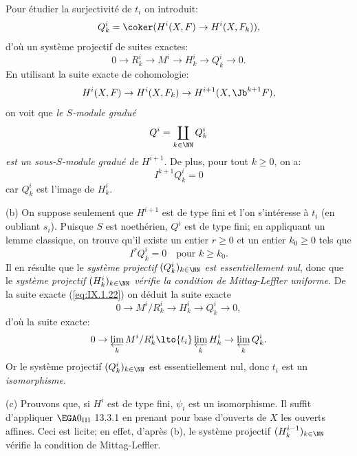 Pour \'etudier la surjectivit\'e de $t_i$ on introduit:
\begin{equation} \label{eq:IX.1.21} Q_k^i = \coker (H^i(X, F) \to H^i(X, F_k)),
\end{equation}
d'o\`u un syst\`eme projectif de suites exactes:
\begin{equation} \label{eq:IX.1.22} 0\to R_k^i \to M^i \to H^i_k \to Q_k^i \to 0.
\end{equation}
En utilisant la suite exacte de cohomologie:
\begin{equation} \label{eq:IX.1.23}
H^i(X, F)\to H^i(X, F_k)\to H^{i+1}(X, {\Jb}^{k+1}F),
\end{equation}
on voit que \emph{le $S$-module gradué}
\begin{equation} \label{eq:IX.1.24}
Q^i=\coprod_{k \in \NN}Q^i_k
\end{equation}
\emph{est un sous-}$S$\emph{-module gradué de} $H^{i+1}$. De plus, pour tout $k\geq 0$, on a:
\begin{equation} \label{eq:IX.1.25}
I^{k+1}Q^i_k=0
\end{equation}
car $Q_k^i$ est l'image de $H^i_k$.

\textup{(b)} \label{stepb} On suppose seulement que $H^{i+1}$ est de type fini et l'on s'int\'eresse \`a $t_i$ (en oubliant $s_i$). Puisque $S$ est noeth\'erien, $Q^i$ est de type fini; en appliquant un lemme classique, on trouve qu'il existe un entier $r\geq 0$ et un entier $k_0\geq 0$ tels que
\begin{equation} \label{eq:IX.1.26}
I^rQ_k^i=0 \quad \text{pour } k\geq k_0.
\end{equation}
Il en r\'esulte que le \emph{système projectif} $(Q_k^i)_{k\in \NN}$ \emph{est essentiellement nul}, donc que le \emph{système projectif $(H_k^i)_{k\in \NN}$ vérifie la condition de Mittag-Leffler uniforme}. De la suite exacte (\ref{eq:IX.1.22}) on d\'eduit la suite exacte
\begin{equation} \label{eq:IX.1.27}
0 \to M^i/R_k^i \to H^i_k \to Q_k^i \to 0,
\end{equation}
d'o\`u la suite exacte:
\begin{equation} \label{eq:IX.1.28}
0\to\varprojlim_{k}M^i/R_k^i \lto{t_i} \varprojlim_{k}H^i_k \to \varprojlim_{k} Q_k^i.
\end{equation}
Or le syst\`eme projectif $(Q_k^i)_{k\in \NN}$ est essentiellement nul, donc $t_i$ est un \emph{isomorphisme}.

\indent\textup{(c)} Prouvons que, si $H^i$ est de type fini, $\psi_i$ est un isomorphisme. Il suffit d'appliquer $\EGA 0_{\textup{III}}$ 13.3.1 en prenant pour base d'ouverts de $X$ les ouverts affines. Ceci est licite; en effet, d'apr\`es (b), le syst\`eme projectif $(H_k^{i-1})_{k\in \NN}$ v\'erifie la condition de Mittag-Leffler.


